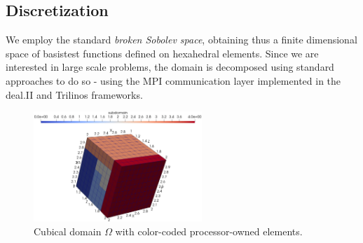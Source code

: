 \documentclass[journal,transmag]{IEEEtran}
\begin{document}
\subsection{Discretization}
We employ the standard \textit{broken Sobolev space}, obtaining thus a finite dimensional space of basis\/test functions defined on hexahedral elements. Since we are interested in large scale problems, the domain is decomposed using standard approaches to do so - using the MPI communication layer implemented in the deal.II and Trilinos frameworks.
\begin{figure}[!t]
		\begin{center}
			\includegraphics[width=2.5in]{cube.jpg}
		\caption{Cubical domain $\Omega$ with color-coded processor-owned elements.}
		\label{figure:domainDecomposition}
		\end{center}
	\end{figure}\vspace{-5mm}
	
\end{document}
